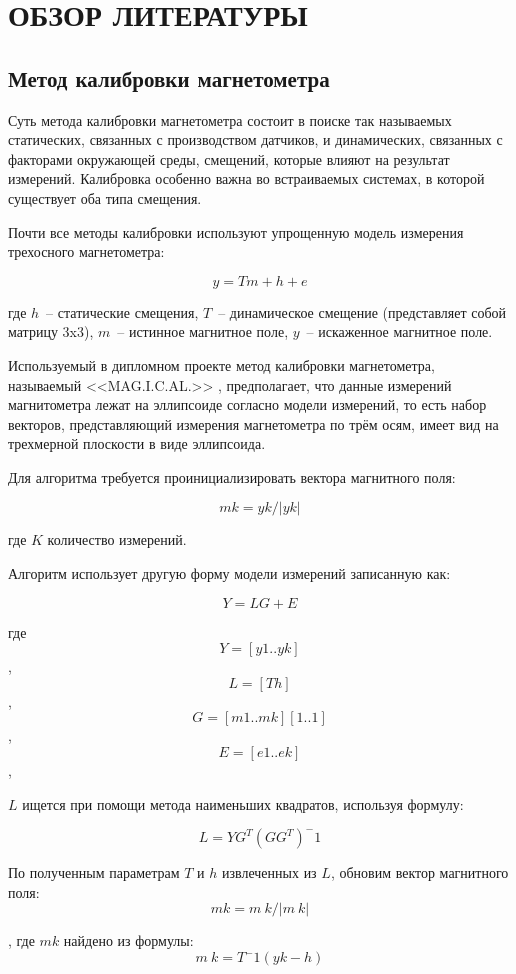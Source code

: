 \section{ОБЗОР ЛИТЕРАТУРЫ}
\label{sec:domain}

\subsection{Метод калибровки магнетометра}
Суть метода калибровки магнетометра состоит в поиске так называемых
статических, связанных с производством датчиков, и динамических, связанных с факторами 
окружающей среды, смещений, которые влияют на результат измерений. 
Калибровка особенно важна во встраиваемых системах, в которой существует оба типа смещения.

Почти все методы калибровки используют упрощенную модель измерения трехосного магнетометра:

$$ y = Tm+h+e$$

где $h$~-- статические смещения, $T$~-- динамическое смещение (представляет собой матрицу 3x3), 
$m$~-- истинное магнитное поле, $y$~-- искаженное магнитное поле.

Используемый в дипломном проекте метод калибровки магнетометра, называемый <<MAG.I.C.AL.>> , предполагает, что данные измерений магнитометра
лежат на эллипсоиде согласно модели измерений, то есть набор векторов, представляющий измерения магнетометра по трём осям, 
имеет вид на трехмерной плоскости в виде эллипсоида. %

Для алгоритма требуется проинициализировать вектора магнитного поля:

$$ mk = yk/|yk| $$

где $K$ количество измерений.

Алгоритм использует другую форму модели измерений записанную как:

$$ Y = LG + E $$

где
$$ Y = [y1..yk] $$,
$$ L = [T h] $$,
$$ G = [m1..mk][1..1] $$,
$$ E = [e1..ek] $$,

$L$ ищется при помощи метода наименьших квадратов, используя формулу:

$$ L=YG^T(GG^T)^-1$$

По полученным параметрам $T$ и $h$ извлеченных из $L$, обновим вектор магнитного поля:
$$ mk = m~k/|m~k| $$

, где $mk$ найдено из формулы:  
$$ m~k = T^-1(yk - h) $$

